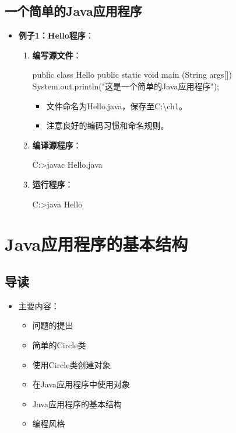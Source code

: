 \documentclass[a4paper, 10pt]{ctexart}
\begin{document}
\subsection{一个简单的Java应用程序}
\begin{itemize}
  \item \textbf{例子1：Hello程序}：
  \begin{enumerate}
    \item \textbf{编写源文件}：
    \begin{codeblock}
public class Hello {
    public static void main (String args[]) {
        System.out.println("这是一个简单的Java应用程序");
    }
}
    \end{codeblock}
    \begin{itemize}
      \item 文件命名为Hello.java，保存至C:\textbackslash ch1。
      \item 注意良好的编码习惯和命名规则。
    \end{itemize}
    \item \textbf{编译源程序}：
    \begin{codeblock}
C:>javac Hello.java
    \end{codeblock}
    \item \textbf{运行程序}：
    \begin{codeblock}
C:>java Hello
    \end{codeblock}
  \end{enumerate}
\end{itemize}

\section{Java应用程序的基本结构}

\subsection{导读}
\begin{itemize}
  \item 主要内容：
  \begin{itemize}
    \item 问题的提出
    \item 简单的Circle类
    \item 使用Circle类创建对象
    \item 在Java应用程序中使用对象
    \item Java应用程序的基本结构
    \item 编程风格
  \end{itemize}
\end{itemize}
\end{document}
